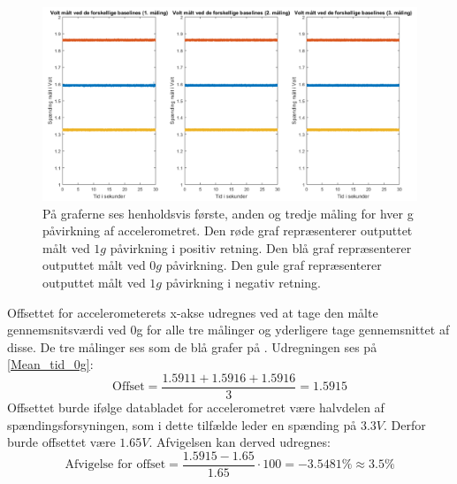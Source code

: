 \begin{figure}[H]
	\centering
	\includegraphics[scale=0.45]{figures/cProblemloesning/Pilotforsoeg_Tid.png}
	\caption{På graferne ses henholdsvis første, anden og tredje måling for hver g påvirkning af accelerometret. Den røde graf repræsenterer outputtet målt ved $1g$ påvirkning i positiv retning. Den blå graf repræsenterer outputtet målt ved $0g$ påvirkning. Den gule graf repræsenterer outputtet målt ved $1g$ påvirkning i negativ retning.}
	\label{Fig:Pilot_Tid}
\end{figure}

Offsettet for accelerometerets x-akse udregnes ved at tage den målte gennemsnitsværdi ved $0$g for alle tre målinger og yderligere tage gennemsnittet af disse. De tre målinger ses som de blå grafer på . Udregningen ses på \ref{Mean_tid_0g}:
\begin{equation}\label{Mean_tid_0g}
\text{Offset} = \frac{1.5911 + 1.5916 + 1.5916}{3} = 1.5915
\end{equation}
\noindent Offsettet burde ifølge databladet for accelerometret være halvdelen af spændingsforsyningen, som i dette tilfælde leder en spænding på $3.3V$. \cite{Devices2009} Derfor burde offsettet være $1.65V$. Afvigelsen kan derved udregnes:
\begin{equation}
\text{Afvigelse for offset} = \dfrac{1.5915 - 1.65}{1.65} \cdot 100 = -3.5481\% \approx 3.5\%
\end{equation}

